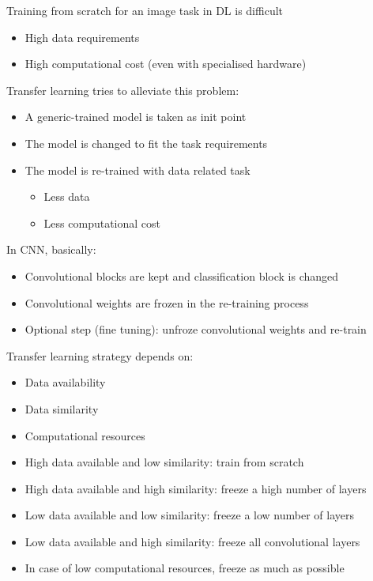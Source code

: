 Training from scratch for an image task in DL is difficult
\begin{itemize}
	\item High data requirements
	\item High computational cost (even with specialised hardware)
\end{itemize}
Transfer learning tries to alleviate this problem:
\begin{itemize}
	\item A generic-trained model is taken as init point
	\item The model is changed to fit the task requirements
	\item The model is re-trained with data related task
   \begin{itemize}
   	\item Less data
	   \item Less computational cost
   \end{itemize}
\end{itemize}
In CNN, basically:
\begin{itemize}
	\item Convolutional blocks are kept and classification block is changed
	\item Convolutional weights are frozen in the re-training process
	\item Optional step (fine tuning): unfroze convolutional weights and re-train
\end{itemize}

Transfer learning strategy depends on:
\begin{itemize}
	\item Data availability
	\item Data similarity
	\item Computational resources
\end{itemize}
\nl

\begin{itemize}
	\item High data available and low similarity: train from scratch
	\item High data available and high similarity: freeze a high number of layers
	\item Low data available and low similarity: freeze a low number of layers
	\item Low data available and high similarity: freeze all convolutional layers
   \item[]In case of low computational resources, freeze as much as possible
\end{itemize}